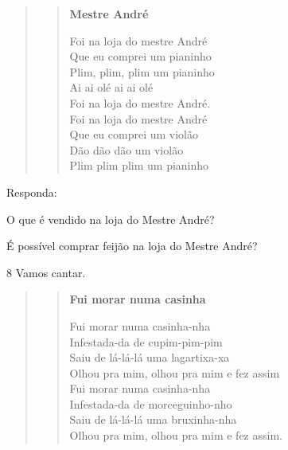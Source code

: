 \begin{quote}
\begin{verse}
\textbf{Mestre André}

Foi na loja do mestre André\\
Que eu comprei um pianinho\\
Plim, plim, plim um pianinho\\
Ai ai olé ai ai olé\\
Foi na loja do mestre André.\\
Foi na loja do mestre André\\
Que eu comprei um violão\\
Dão dão dão um violão\\
Plim plim plim um pianinho
\end{verse}

\end{quote}

Responda:

\begin{escolha}
\item O que é vendido na loja do Mestre André?


\item É possível comprar feijão na loja do Mestre André?

\end{escolha}

\num{8} Vamos cantar.

\begin{quote}
\begin{verse}
\textbf{Fui morar numa casinha}

Fui morar numa casinha-nha\\
Infestada-da de cupim-pim-pim\\
Saiu de lá-lá-lá uma lagartixa-xa\\
Olhou pra mim, olhou pra mim e fez assim\\
Fui morar numa casinha-nha\\
Infestada-da de morceguinho-nho\\
Saiu de lá-lá-lá uma bruxinha-nha\\
Olhou pra mim, olhou pra mim e fez assim.
\end{verse}

\end{quote}

